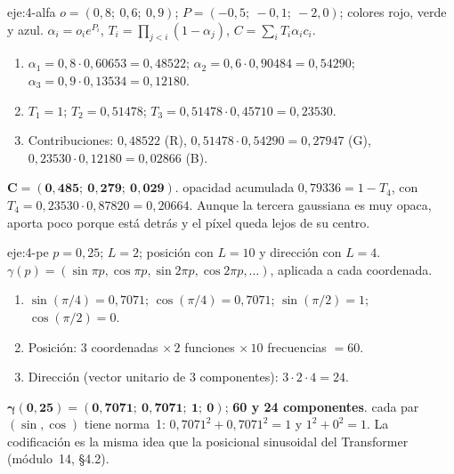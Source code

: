\begin{solucion}{eje:4-alfa}
\datos $o=(0{,}8;\ 0{,}6;\ 0{,}9)$; $P=(-0{,}5;\ -0{,}1;\ -2{,}0)$; colores rojo, verde y azul.
\planteamiento $\alpha_i=o_ie^{P_i}$, $T_i=\prod_{j<i}(1-\alpha_j)$, $C=\sum_iT_i\alpha_ic_i$.
\pasos
\begin{enumerate}[label=\arabic*.]
  \item $\alpha_1=0{,}8\cdot 0{,}60653=0{,}48522$; $\alpha_2=0{,}6\cdot 0{,}90484=0{,}54290$; $\alpha_3=0{,}9\cdot 0{,}13534=0{,}12180$.
  \item $T_1=1$; $T_2=0{,}51478$; $T_3=0{,}51478\cdot 0{,}45710=0{,}23530$.
  \item Contribuciones: $0{,}48522$ (R), $0{,}51478\cdot 0{,}54290=0{,}27947$ (G), $0{,}23530\cdot 0{,}12180=0{,}02866$ (B).
\end{enumerate}
\resultado $\mathbf{C=(0{,}485;\ 0{,}279;\ 0{,}029)}$.
\comprobacion opacidad acumulada $0{,}79336=1-T_4$, con $T_4=0{,}23530\cdot 0{,}87820=0{,}20664$. Aunque la tercera gaussiana es muy opaca, aporta poco porque está detrás y el píxel queda lejos de su centro.
\end{solucion}

\begin{solucion}{eje:4-pe}
\datos $p=0{,}25$; $L=2$; posición con $L=10$ y dirección con $L=4$.
\planteamiento $\gamma(p)=(\sin\pi p,\cos\pi p,\sin 2\pi p,\cos 2\pi p,\dots)$, aplicada a cada coordenada.
\pasos
\begin{enumerate}[label=\arabic*.]
  \item $\sin(\pi/4)=0{,}7071$; $\cos(\pi/4)=0{,}7071$; $\sin(\pi/2)=1$; $\cos(\pi/2)=0$.
  \item Posición: $3$ coordenadas $\times\,2$ funciones $\times\,10$ frecuencias $=60$.
  \item Dirección (vector unitario de 3 componentes): $3\cdot 2\cdot 4=24$.
\end{enumerate}
\resultado $\mathbf{\gamma(0{,}25)=(0{,}7071;\ 0{,}7071;\ 1;\ 0)}$; \textbf{60 y 24 componentes}.
\comprobacion cada par $(\sin,\cos)$ tiene norma~1: $0{,}7071^2+0{,}7071^2=1$ y $1^2+0^2=1$. La codificación es la misma idea que la posicional sinusoidal del Transformer (módulo~14, §4.2).
\end{solucion}

